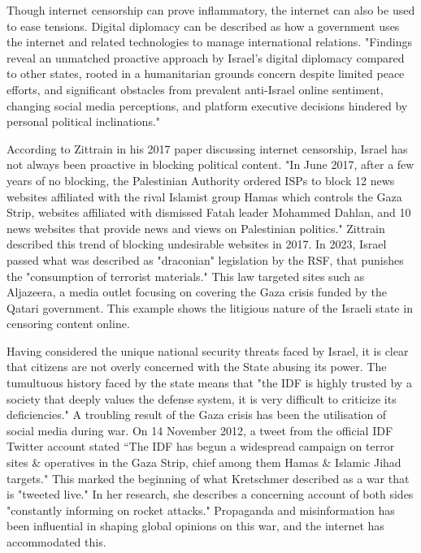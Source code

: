 Though internet censorship can prove inflammatory, the internet can also be used to ease tensions. Digital diplomacy can be described as how a government uses the internet and related technologies to manage international relations. "Findings reveal an unmatched proactive approach by Israel’s digital diplomacy compared to other states, rooted in a humanitarian grounds concern despite limited peace efforts, and significant obstacles from prevalent anti-Israel online sentiment, changing social media perceptions, and platform executive decisions hindered by personal political inclinations." \cite{Othman2025DigitalDiplomacy} 

According to Zittrain in his 2017 paper discussing internet censorship, Israel has not always been proactive in blocking political content. "In June 2017, after a few years of no blocking, the Palestinian Authority ordered ISPs to block 12 news websites affiliated with the rival Islamist group Hamas which controls the Gaza Strip, websites affiliated with dismissed Fatah leader Mohammed Dahlan, and 10 news websites that provide news and views on Palestinian politics." \cite{zittrain2017shifting} Zittrain described this trend of blocking undesirable websites in 2017. In 2023, Israel passed what was described as "draconian" legislation by the RSF, that punishes the "consumption of terrorist materials." \cite{RSF2024IsraelCensorship} This law targeted sites such as Aljazeera, a media outlet focusing on covering the Gaza crisis funded by the Qatari government. \cite{AlJazeera2023Knesset} This example shows the litigious nature of the Israeli state in censoring content online. 

Having considered the unique national security threats faced by Israel, it is clear that citizens are not overly concerned with the State abusing its power. The tumultuous history faced by the state means that "the IDF is highly trusted by a society that deeply values the defense system, it is very difficult to criticize its deficiencies." \cite{MAGEN2018287} A troubling result of the Gaza crisis has been the utilisation of social media during war. On 14 November 2012, a tweet from the official IDF Twitter account stated “The IDF has begun a widespread campaign on terror sites \& operatives in the
Gaza Strip, chief among them Hamas \& Islamic Jihad targets." \cite{IDF_Twitter} This marked the beginning of what Kretschmer described as a war that is "tweeted live." In her research, she describes a concerning account of both sides "constantly informing on rocket attacks." \cite {Kretschmer_2017} Propaganda and misinformation has been influential in shaping global opinions on this war, and the internet has accommodated this.

